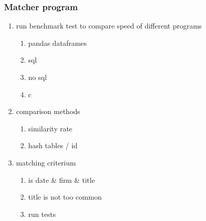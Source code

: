 \documentclass[11pt]{article}
\begin{document}
\subsubsection{Matcher program}
\label{sec:org33a175a}
\begin{enumerate}
\item run benchmark test to compare speed of different programs
\label{sec:orga76c57b}
\begin{enumerate}
\item pandas dataframes
\label{sec:orgeb33198}
\item sql
\label{sec:org9a0e94d}
\item no sql
\label{sec:org3e41fae}
\item c
\label{sec:orge5f80ef}
\end{enumerate}
\item comparison methods
\label{sec:org01d3a66}
\begin{enumerate}
\item similarity rate
\label{sec:org18efc7d}
\item hash tables / id
\label{sec:orgf7b57c2}
\end{enumerate}
\item matching criterium
\label{sec:orgf94656a}
\begin{enumerate}
\item is date \& firm \& title
\label{sec:orga0cab4f}
\item title is not too common
\label{sec:orgb08a05b}
\item run tests
\label{sec:org855ebf6}
\end{enumerate}
\end{enumerate}
\end{document}
